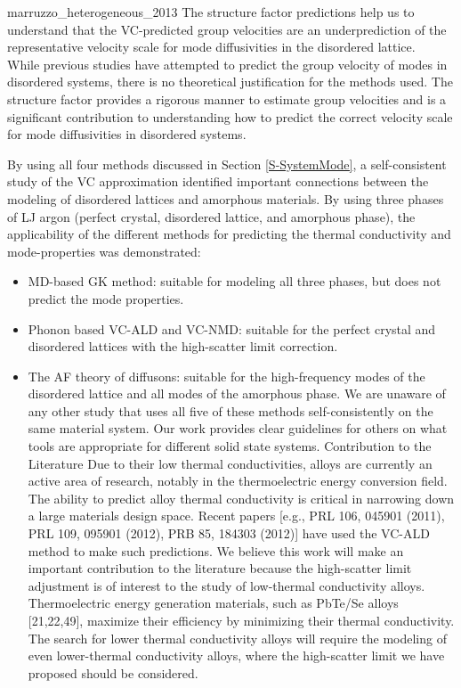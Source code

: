 \begin{itemize}
{marruzzo_heterogeneous_2013} 
The structure factor predictions help us to 
understand that the VC-predicted group velocities are an 
underprediction of the representative velocity scale for mode 
diffusivities in the disordered lattice.  While previous studies 
have attempted to predict the group velocity of modes in disordered 
systems, there is no theoretical justification for the methods used.
\cite{duda_reducing_2011,donadio_atomistic_2009,
he_heat_2011,he_thermal_2011,he_morphology_2011,hori_phonon_2013} 
The structure factor provides a rigorous manner to estimate 
group velocities and is a significant contribution to understanding 
how to predict the correct velocity scale for mode diffusivities in 
disordered systems. 
\end{itemize}

By using all four methods discussed in 
Section \ref{S-SystemMode}, a self-consistent study of the VC approximation 
identified important connections between the modeling 
of disordered lattices and amorphous materials. 
By using three phases of LJ argon (perfect crystal, disordered lattice, 
and amorphous phase), the applicability 
of the different methods for predicting the thermal conductivity and 
mode-properties was demonstrated:
\begin{itemize}
\item MD-based GK method: suitable for modeling all 
three phases, but does not predict the mode properties.
\item Phonon based VC-ALD and VC-NMD: suitable for the perfect crystal 
and disordered lattices with the high-scatter limit correction.
\item The AF theory of diffusons: suitable for the high-frequency modes 
of the disordered lattice and all modes of the amorphous phase. 
We are unaware of any other study that uses all five of these methods 
self-consistently on the same material system. Our work provides clear 
guidelines for others on what tools are appropriate for different 
solid state systems.
Contribution to the Literature
Due to their low thermal conductivities, alloys are currently an active 
area of research, notably in the thermoelectric energy conversion field. 
The ability to predict alloy thermal conductivity is critical in 
narrowing down a large materials design space. Recent papers 
[e.g., PRL 106, 045901 (2011), PRL 109, 095901 (2012), 
PRB 85, 184303 (2012)] have used the VC-ALD method to make such 
predictions.
We believe this work will make an important contribution to the 
literature because the high-scatter limit adjustment is of interest 
to the study of low-thermal conductivity alloys. Thermoelectric energy 
generation materials, such as PbTe/Se alloys [21,22,49], maximize their 
efficiency by minimizing their thermal conductivity. The search for 
lower thermal conductivity alloys will require the modeling of even 
lower-thermal conductivity alloys, where the high-scatter limit we 
have proposed should be considered.
\end{itemize}

